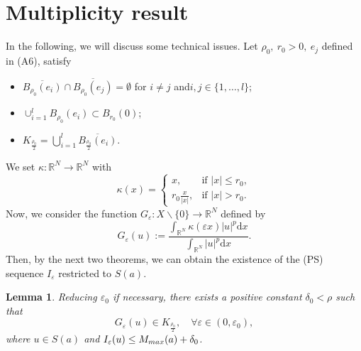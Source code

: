 \documentclass[10pt,a4paper]{amsart}
\numberwithin{equation}{section}
\newtheorem{lemma}[theorem]{Lemma}
\begin{document}
\section{Multiplicity result}

In the following, we will discuss some technical issues. 
Let $\rho_0,~r_0> 0,~e_j$ defined in (A6), satisfy
\begin{itemize}
\item $\overline{B_{\rho_{0}}(e_i)}\cap\overline{B_{\rho_{0}}(e_j)}=\emptyset$
for $i\neq j$ and$i,j\in{\{1,\dots,l\}}$;

\item $\cup_{i=1}^{l}B_{\rho_{0}}(e_i)\subset B_{r_{0}}(0)$;

\item $K_{\frac{\rho_0}{2}}=\bigcup_{i=1}^{l}\overline {B_{\frac{\rho_{0}}{2}}(e_i)}$.
\end{itemize}
We set $\kappa:\mathbb{R}^N\to\mathbb{R}^N$ with
$$
\kappa(x)= \begin{cases}
x, &\text{if }|x|\le r_0,\\
r_0\frac{x}{|x|}, &\text{if }|x|>r_0.
\end{cases}
$$
Now, we consider the function $G_\varepsilon : X\backslash\{0\} \to \mathbb{R}^N$ 
defined by
$$
G_\varepsilon(u):=\frac{\int_{\mathbb{R}^N}\kappa(\varepsilon x)|u|^{p}
\mathrm{d}x}{\int_{\mathbb{R}^N}|u|^{p}\mathrm{d}x}.
$$
Then, by the next two theorems, we can obtain the existence of the (PS) sequence
 $I_\varepsilon$ restricted to $S(a)$.

\begin{lemma}\label{lem:4.1}
Reducing $\varepsilon_0$ if necessary, there exists a positive constant 
$\delta_0 < \rho$ such that
$$
G_\varepsilon(u) \in K_{\frac{\rho_0}{2}},\quad\forall \varepsilon\in(0,\varepsilon_0),
$$ 
where $u\in S(a)$ and $I_\varepsilon(u)\le M_{\rm max}(a)+\delta_0$.
\end{lemma}
\end{document}
